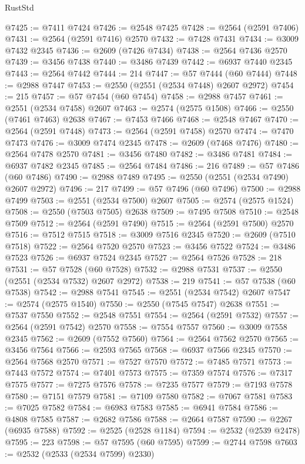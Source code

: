 \begin{lexlean}{RustStd}
\begin{coremodule}
@7425 := @7411 @7424
@7426 := @2548 @7425
@7428 := @2564 (@2591 @7406)
@7431 := @2564 (@2591 @7416) @2570
@7432 := @7428 @7431
@7434 := @3009 @7432 @2345
@7436 := @2609 (@7426 @7434)
@7438 := @2564 @7436 @2570
@7439 := @3456 @7438
@7440 := @3486 @7439
@7442 := @6937 @7440 @2345
@7443 := @2564 @7442
@7444 := 214
@7447 := @57 @7444 (@60 @7444)
@7448 := @2988 @7447
@7453 := @2550 (@2551 (@2534 @7448) @2607 @2972)
@7454 := 215
@7457 := @57 @7454 (@60 @7454)
@7458 := @2988 @7457
@7461 := @2551 (@2534 @7458) @2607
@7463 := @2574 (@2575 @1508)
@7466 := @2550 (@7461 @7463) @2638
@7467 := @7453 @7466
@7468 := @2548 @7467
@7470 := @2564 (@2591 @7448)
@7473 := @2564 (@2591 @7458) @2570
@7474 := @7470 @7473
@7476 := @3009 @7474 @2345
@7478 := @2609 (@7468 @7476)
@7480 := @2564 @7478 @2570
@7481 := @3456 @7480
@7482 := @3486 @7481
@7484 := @6937 @7482 @2345
@7485 := @2564 @7484
@7486 := 216
@7489 := @57 @7486 (@60 @7486)
@7490 := @2988 @7489
@7495 := @2550 (@2551 (@2534 @7490) @2607 @2972)
@7496 := 217
@7499 := @57 @7496 (@60 @7496)
@7500 := @2988 @7499
@7503 := @2551 (@2534 @7500) @2607
@7505 := @2574 (@2575 @1524)
@7508 := @2550 (@7503 @7505) @2638
@7509 := @7495 @7508
@7510 := @2548 @7509
@7512 := @2564 (@2591 @7490)
@7515 := @2564 (@2591 @7500) @2570
@7516 := @7512 @7515
@7518 := @3009 @7516 @2345
@7520 := @2609 (@7510 @7518)
@7522 := @2564 @7520 @2570
@7523 := @3456 @7522
@7524 := @3486 @7523
@7526 := @6937 @7524 @2345
@7527 := @2564 @7526
@7528 := 218
@7531 := @57 @7528 (@60 @7528)
@7532 := @2988 @7531
@7537 := @2550 (@2551 (@2534 @7532) @2607 @2972)
@7538 := 219
@7541 := @57 @7538 (@60 @7538)
@7542 := @2988 @7541
@7545 := @2551 (@2534 @7542) @2607
@7547 := @2574 (@2575 @1540)
@7550 := @2550 (@7545 @7547) @2638
@7551 := @7537 @7550
@7552 := @2548 @7551
@7554 := @2564 (@2591 @7532)
@7557 := @2564 (@2591 @7542) @2570
@7558 := @7554 @7557
@7560 := @3009 @7558 @2345
@7562 := @2609 (@7552 @7560)
@7564 := @2564 @7562 @2570
@7565 := @3456 @7564
@7566 := @2593 @7565
@7568 := @6937 @7566 @2345
@7570 := @2564 @7568 @2570
@7571 := @7527 @7570
@7572 := @7485 @7571
@7573 := @7443 @7572
@7574 := @7401 @7573
@7575 := @7359 @7574
@7576 := @7317 @7575
@7577 := @7275 @7576
@7578 := @7235 @7577
@7579 := @7193 @7578
@7580 := @7151 @7579
@7581 := @7109 @7580
@7582 := @7067 @7581
@7583 := @7025 @7582
@7584 := @6983 @7583
@7585 := @6941 @7584
@7586 := @4808 @7585
@7587 := @2682 @7586
@7588 := @2664 @7587
@7590 := @2267 (@6935 @7588)
@7592 := @2525 (@2528 @1184)
@7594 := @2532 (@2539 @2478)
@7595 := 223
@7598 := @57 @7595 (@60 @7595)
@7599 := @2744 @7598
@7603 := @2532 (@2533 (@2534 @7599) @2330)

\end{coremodule}
\end{lexlean}
